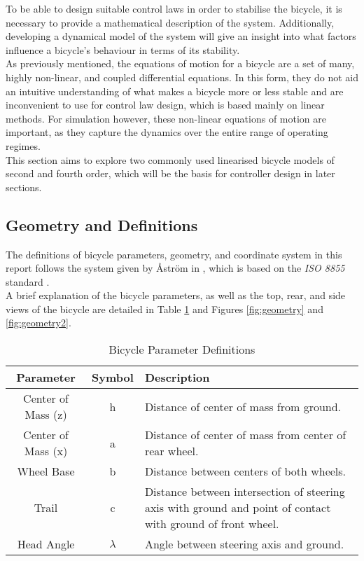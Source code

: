 To be able to design suitable control laws in order to stabilise the bicycle, it is necessary to provide a mathematical description of the system. Additionally, developing a dynamical model of the system will give an insight into what factors influence a bicycle's behaviour in terms of its stability. \\

As previously mentioned, the equations of motion for a bicycle are a set of many, highly non-linear, and coupled differential equations. In this form, they do not aid an intuitive understanding of what makes a bicycle more or less stable and are inconvenient to use for control law design, which is based mainly on linear methods. For simulation however, these non-linear equations of motion are important, as they capture the dynamics over the entire range of operating regimes. \\

This section aims to explore two commonly used linearised bicycle models of second and fourth order, which will be the basis for controller design in later sections.

\subsection{Geometry and Definitions}
The definitions of bicycle parameters, geometry, and coordinate system in this report follows the system given by {\AA}str{\"o}m in \cite{astrom}, which is based on the \textit{ISO 8855} standard \cite{iso}. \\

A brief explanation of the bicycle parameters, as well as the top, rear, and side views of the bicycle are detailed in Table \ref{table:params} and Figures \ref{fig:geometry} and \ref{fig:geometry2}. \\

\begin{table}[h]
	\centering
 	\begin{tabular}[t]{c c p{10cm}} 
	\toprule
	Parameter & Symbol & Description \\
 	\midrule
 	Center of Mass (z) & h & Distance of center of mass from ground.\\ 
 	Center of Mass (x) & a & Distance of center of mass from center of rear wheel.\\
 	Wheel Base & b & Distance between centers of both wheels.\\
 	Trail & c & Distance between intersection of steering axis with ground and point of contact with ground of front wheel.\\
 	Head Angle & $\lambda$ & Angle between steering axis and ground.\\
 	\bottomrule
	\end{tabular}
 	\caption{Bicycle Parameter Definitions}
	\label{table:params}
\end{table}

